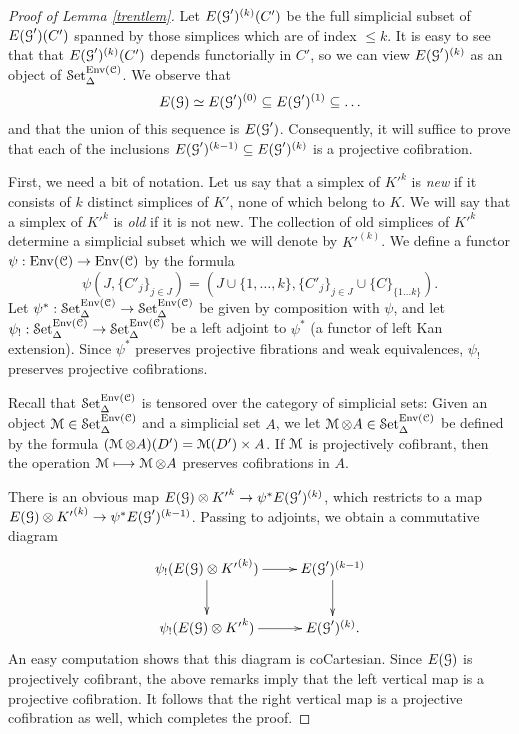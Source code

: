 \begin{proof}[Proof of Lemma \ref{trentlem}]
Let $E(\operatorname{\mathcal{G}}')^{(k)}(C')$ be the full simplicial subset of $E(\operatorname{\mathcal{G}}')(C')$ spanned by those simplices which are of index $\leq k$. It is easy to see that that $E(\operatorname{\mathcal{G}}')^{(k)}(C')$ depends functorially in $C'$, so we can view $E(\operatorname{\mathcal{G}}')^{(k)}$ as an object of $\operatorname{\mathcal{S}et}_{\Delta}^{\operatorname{Env}(\operatorname{\mathcal{C}})}$. We observe that
$$ E(\operatorname{\mathcal{G}}) \simeq E(\operatorname{\mathcal{G}}')^{(0)} \subseteq E(\operatorname{\mathcal{G}}')^{(1)} \subseteq \ldots $$
and that the union of this sequence is $E(\operatorname{\mathcal{G}}')$. Consequently, it will suffice to prove that
each of the inclusions $E(\operatorname{\mathcal{G}}')^{(k-1)} \subseteq E(\operatorname{\mathcal{G}}')^{(k)}$ is a projective cofibration.

First, we need a bit of notation. Let us say that a simplex of ${K'}^{k}$ is {\it new} if it consists of $k$ distinct simplices of $K'$, none of which belong to $K$. We will say that a simplex of ${K'}^{k}$ is {\it old} if it is not new. The collection of old simplices of ${K'}^{k}$ determine a simplicial subset which we will denote by ${K'}^{(k)}$. We define a functor $\psi: \operatorname{Env}(\operatorname{\mathcal{C}}) \rightarrow \operatorname{Env}(\operatorname{\mathcal{C}})$ by the formula
$$\psi( J, \{ C'_{j} \}_{j \in J} ) = ( J \cup \{ 1, \ldots, k \}, \{ C'_{j} \}_{j \in J} \cup \{ C \}_{\{1 \ldots k \}} ).$$
Let $\psi^{\ast}: \operatorname{\mathcal{S}et}_{\Delta}^{\operatorname{Env}(\operatorname{\mathcal{C}})} \rightarrow \operatorname{\mathcal{S}et}_{\Delta}^{\operatorname{Env}(\operatorname{\mathcal{C}})}$ be given by composition with $\psi$, and let $\psi_{!}: \operatorname{\mathcal{S}et}_{\Delta}^{\operatorname{Env}(\operatorname{\mathcal{C}})} \rightarrow \operatorname{\mathcal{S}et}_{\Delta}^{\operatorname{Env}(\operatorname{\mathcal{C}})}$ be a left adjoint to $\psi^{\ast}$ (a functor of left Kan extension).
Since $\psi^{\ast}$ preserves projective fibrations and weak equivalences, $\psi_{!}$ preserves projective cofibrations.

Recall that $\operatorname{\mathcal{S}et}_{\Delta}^{\operatorname{Env}(\operatorname{\mathcal{C}})}$ is tensored over the category of simplicial sets:
Given an object $\operatorname{\mathcal{M}} \in \operatorname{\mathcal{S}et}_{\Delta}^{\operatorname{Env}(\operatorname{\mathcal{C}})}$ and a simplicial set $A$, we let $\operatorname{\mathcal{M}} \otimes A \in \operatorname{\mathcal{S}et}_{\Delta}^{\operatorname{Env}(\operatorname{\mathcal{C}})}$ be defined by the formula
$( \operatorname{\mathcal{M}} \otimes A)(D') = \operatorname{\mathcal{M}}(D') \times A$. If $\operatorname{\mathcal{M}}$ is projectively cofibrant, then the operation
$\operatorname{\mathcal{M}} \longmapsto \operatorname{\mathcal{M}} \otimes A$ preserves cofibrations in $A$.

There is an obvious map $E(\operatorname{\mathcal{G}}) \otimes {K'}^k \rightarrow \psi^{\ast} E(\operatorname{\mathcal{G}}')^{(k)}$, which restricts to a map $E(\operatorname{\mathcal{G}}) \otimes {K'}^{(k)} \rightarrow \psi^{\ast} E(\operatorname{\mathcal{G}}')^{(k-1)}$. Passing to adjoints, we obtain a commutative diagram
$$ \xymatrix{ \psi_{!}( E(\calG) \otimes {K'}^{(k)} ) \ar[d] \ar[r] & E(\calG')^{(k-1)} \ar[d] \\
\psi_{!}( E(\calG) \otimes {K'}^k ) \ar[r] & E(\calG')^{(k)}. }$$
An easy computation shows that this diagram is coCartesian.
Since $E(\operatorname{\mathcal{G}})$ is projectively cofibrant, the above remarks imply that the left vertical map is a projective cofibration. It follows that the right vertical map is a projective cofibration as well, which completes the proof.
\end{proof}

